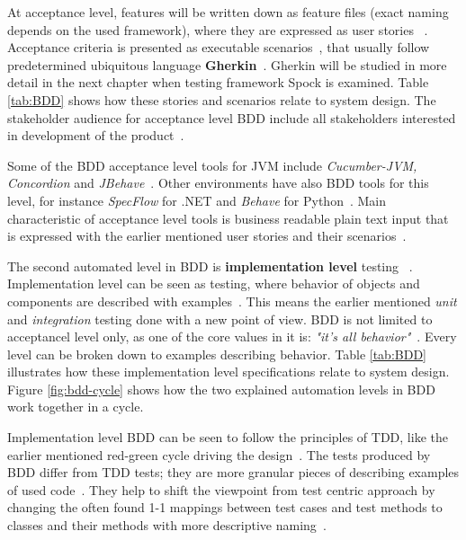     At acceptance level, features will be written down as feature files (exact naming depends on the used framework), where they are
    expressed as user stories ~\cite{chelimsky2010rspec}. Acceptance criteria is presented as executable scenarios~\cite{bdd2006north}, that usually
    follow predetermined ubiquitous language \textbf{Gherkin}~\cite{okolnychyi2016study}. Gherkin will be studied in more detail in the next
    chapter when testing framework Spock is examined. Table \ref{tab:BDD} shows how these stories and scenarios relate to system design.
    The stakeholder audience for acceptance level BDD include all stakeholders interested in development of the product~\cite{smart2014bdd}.

    Some of the BDD acceptance level tools for JVM include \textit{Cucumber-JVM, Concordion} and \textit{JBehave}~\cite{okolnychyi2016study}. Other
    environments have also BDD tools for this level, for instance \textit{SpecFlow} for .NET and \textit{Behave} for Python~\cite{smart2014bdd}.
    Main characteristic of acceptance level tools is business readable plain text input that is expressed with the earlier mentioned
    user stories and their scenarios~\cite{okolnychyi2016study}.

    The second automated level in BDD is \textbf{implementation level} testing ~\cite{chelimsky2010rspec,solis2011study,smart2014bdd,okolnychyi2016study}.
    Implementation level can be seen as testing, where behavior of objects and components are described with examples~\cite{chelimsky2010rspec}.
    This means the earlier mentioned \textit{unit} and \textit{integration} testing done with a new point of view. BDD is not limited to acceptancel level
    only, as one of the core values in it is:
    \textit{"it's all behavior"}~\cite{chelimsky2010rspec}. Every level can be broken down to examples describing behavior.
    Table \ref{tab:BDD} illustrates how these implementation level specifications relate to system design. Figure \ref{fig:bdd-cycle}
    shows how the two explained automation levels in BDD work together in a cycle.

    Implementation level BDD can be seen to follow the principles of TDD, like the earlier mentioned red-green cycle driving
    the design~\cite{smart2014bdd}. The tests produced by BDD differ from TDD tests; they are more granular pieces of
    describing examples of used code~\cite{astels2006new}. They help to shift the viewpoint from test centric approach by
    changing the often found 1-1 mappings between test cases and test methods to classes and their methods with more descriptive naming~\cite{astels2006new}.

